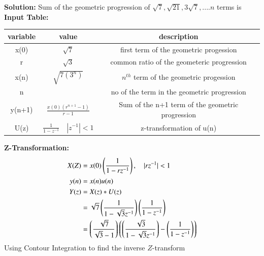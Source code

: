 \documentclass[a4,12pt,onecolumn]{IEEEtran}
\begin{document}
\textbf{Solution:}
 Sum of the geometric progression of $\sqrt{7}, \sqrt{21}, 3\sqrt{7},....n$ terms is\\
 \textbf{Input Table:}
 \begin{center}
\begin{tabular}{|c|c|c|}
   \hline
   variable&value&description  \\
   \hline
   x(0) & $ \sqrt{7} $& first term of the geometric progession\\
   \hline
   r & $\sqrt{3}$ & common ratio of the geometeric progression\\
   \hline
   x(n) & $\sqrt{7(3^{n})}$& $n^{th}$ term of the geometric progession\\
   \hline
   n& &no of the term in the geometric progression\\
   \hline
   y(n+1) &$\frac{x(0)(r^{n+1}-1)}{r-1}$ &Sum of the n+1 term of the geometric progression\\
   \hline 
   U(z)&$\frac{1}{1-z^{-1}} \quad{|z^{-1}|<1}$&z-transformation of u(n)\\
   \hline
\end{tabular}
\end{center}
\textbf{\large{Z-Transformation:}}
\begin{align}
X(Z) &= x(0)\left(\frac{1}{1-rz^{-1}}\right), \quad{|rz^{-1}|<1}\\
y(n)&=x(n)u(n)\\
Y(z)&=X(z)*U(z)\\
&=\sqrt{7}\left(\frac{1}{1-\sqrt{3}z^{-1}}\right)\left(\frac{1}{1-z^{-1}}\right)\\
&=\left(\frac{\sqrt{7}}{\sqrt{3}-1}\right)\left(\left(\frac{\sqrt{3}}{1-\sqrt{3}z^{-1}}\right)-\left(\frac{1}{1-z^{-1}}\right)\right)
\end{align}
 Using Contour Integration to find the inverse $Z$-transform
\end{document}
